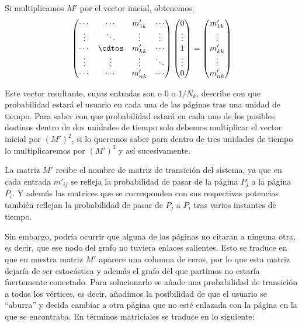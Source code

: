 \documentclass[size=a4, parskip=half, titlepage=false, toc=flat, toc=bib, 12pt]{scrartcl}
\theoremstyle{theorem-style}
\theoremstyle{definition-style}
\theoremstyle{remark-style}
\theoremstyle{example-style}
\theoremstyle{definition-style}
\theoremstyle{remark-style}
\begin{document}
Si multiplicamos $M'$ por el vector inicial, obtenemos:
$$\begin{pmatrix}
\cdots & \cdots & m'_{1k} & \cdots \\
\vdots & \ddots & \vdots & \vdots \\
\cdots & \cdtos & m'_{kk} & \cdots \\
\vdots & \vdots & \vdots & \ddots \\
\cdots & \cdots & m'_{nk} & \cdots \end{pmatrix} \begin{pmatrix}
0 \\
\vdots \\
1 \\
\vdots \\
0 \end{pmatrix} = \begin{pmatrix}
m'_{1k}\\
\vdots \\
m'_{kk} \\
\vdots \\
m'_{nk} \end{pmatrix}$$

Este vector resultante, cuyas entradas son o $0$ o $1/N_k$, describe con que probabilidad estará el usuario en cada una de las páginas tras una unidad de tiempo. Para saber con que probabilidad estará en cada uno de los posibles destinos dentro de dos unidades de tiempo solo debemos multiplicar el vector inicial por $(M')^2$, si lo queremos saber para dentro de tres unidades de tiempo lo multiplicaremos por $(M')^3$ y así sucesivamente.

La matriz $M'$ recibe el nombre de matriz de transición del sistema, ya que en cada entrada $m'_{ij}$ se refleja la probabilidad de pasar de la página $P_j$ a la página $P_i$. Y además las matrices que se corresponden con sus respectivas potencias también reflejan la probabilidad de pasar de $P_j$ a $P_i$ tras varios instantes de tiempo.

Sin embargo, podría ocurrir que alguna de las páginas no citaran a ninguna otra, es decir, que ese nodo del grafo no tuviera enlaces salientes. Esto se traduce en que en nuestra matriz $M'$ aparece una columna de ceros, por lo que esta matriz dejaría de ser estocástica y además el grafo del que partimos no estaría fuertemente conectado. Para solucionarlo se añade una probabilidad de transición a todos los vértices, es decir, añadimos la posibilidad de que el usuario se ``aburra'' y decida cambiar a otra página que no esté enlazada con la página en la que se encontraba. En términos matriciales se traduce en lo siguiente:
\end{document}
